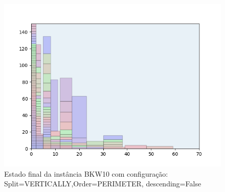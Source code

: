 \begin{figure}[H]
    \centering
    \caption[]{Estado final da instância BKW10 com configuração: Split=VERTICALLY,Order=PERIMETER, descending=False}
    \label{fig:bkw10-vertically-perimeter-false}
    \includegraphics[scale=0.5]{output/figures/bkw/bkw10/vertically/perimeter/false/000}
\end{figure}